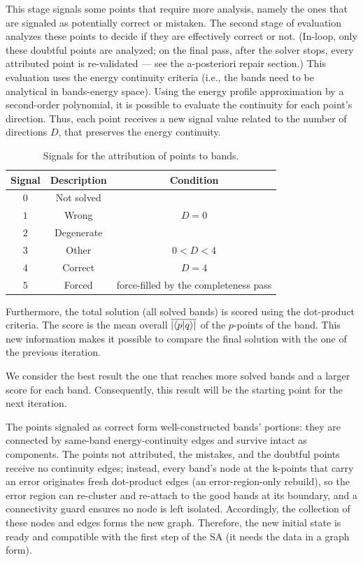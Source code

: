 \documentclass[a4paper,12pt]{report}
\begin{document}
\begin{appendices}
This stage signals some points that require more analysis, namely the ones that are signaled as potentially correct or mistaken.
The second stage of evaluation analyzes these points to decide if they are effectively correct or not.
(In-loop, only these doubtful points are analyzed; on the final pass, after the solver stops, every attributed point is re-validated --- see the a-posteriori repair section.)
This evaluation uses the energy continuity criteria (i.e., the bands need to be analytical in bands-energy space).
Using the energy profile approximation by a second-order polynomial, it is possible to evaluate the continuity for each point's direction.
Thus, each point receives a new signal value related to the number of directions $D$, that preserves the energy continuity.

\begin{table}[H]
    \center
    \caption{Signals for the attribution of points to bands.}\label{tab:signals2}
    \begin{tabular}{ccc}
        \hline
        Signal & Description       & Condition                                  \\\hline
        $0$    & Not solved        &                                            \\
        $1$    & Wrong             & $D=0$        \\
        $2$    & Degenerate        &                                            \\
        $3$    & Other             & $0<D<4$  \\
        $4$    & Correct           & $D = 4$           \\
        $5$    & Forced            & force-filled by the completeness pass  \\\hline
    \end{tabular}

\end{table}


Furthermore,  the total solution (all solved bands) is scored using the dot-product criteria.
The score is the mean overall $\overline{\left|\braket{p}{q}\right|}$ of the $p$-points of the band.
This new information makes it possible to compare the final solution with the one of the previous iteration.

We consider the best result the one that reaches more solved bands and a larger score for each band.
Consequently, this result will be the starting point for the next iteration.

The points signaled as correct form well-constructed bands' portions: they are connected by same-band energy-continuity edges and survive intact as components.
The points not attributed, the mistakes, and the doubtful points receive no continuity edges; instead, every band's node at the k-points that carry an error originates fresh dot-product edges (an error-region-only rebuild), so the error region can re-cluster and re-attach to the good bands at its boundary, and a connectivity guard ensures no node is left isolated.
Accordingly, the collection of these nodes and edges forms the new graph.
Therefore, the new initial state is ready and compatible with the first step of the SA (it needs the data in a graph form).


\end{appendices}
\end{document}
